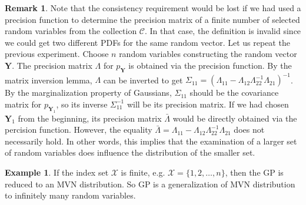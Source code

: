 \documentclass[10pt]{article}
\theoremstyle{definition}
\newtheorem{exmp}{Example}[section]
\newtheorem*{rem}{Remark}
\begin{document}
\begin{rem}
Note that the consistency requirement would be lost if we had used a precision function to determine the precision matrix of a finite number of selected random variables from the collection $\mathscr{C}$. In that case, the definition is invalid since we could get two different PDFs for the same random vector. Let us repeat the previous experiment. Choose $n$ random variables constructing the random vector $\mathbf{Y}$. The precision matrix $\Lambda$ for $p_{\mathbf{Y}}$ is obtained via the precision function. By the matrix inversion lemma, $\Lambda$ can be inverted to get $\mathsf{\Sigma}_{11} = (\mathsf{\Lambda}_{11} - \mathsf{\Lambda}_{12} \mathsf{\Lambda}_{22}^{-1} \mathsf{\Lambda}_{21})^{-1}$. By the marginalization property of Gaussians, $\Sigma_{11}$ should be the covariance matrix for $p_{\mathbf{Y}_1}$, so its inverse $\Sigma_{11}^{-1}$ will be its precision matrix. If we had chosen $\mathbf{Y}_1$ from the beginning, its precision matrix $\bar{\Lambda}$ would be directly obtained via the percision function. However, the equality $\bar{\Lambda}=\mathsf{\Lambda}_{11} - \mathsf{\Lambda}_{12} \mathsf{\Lambda}_{22}^{-1} \mathsf{\Lambda}_{21}$ does not necessarily hold. In other words, this implies that the examination of a larger set of random variables does influence the distribution of the smaller set.
\end{rem}
\begin{exmp}
If the index set $\mathcal{X}$ is finite, e.g. $\mathcal{X}=\{1,2,\dots,n\}$, then the GP is reduced to an MVN distribution. So GP is a generalization of MVN distribution to infinitely many random variables.
\end{exmp}
\end{document}
